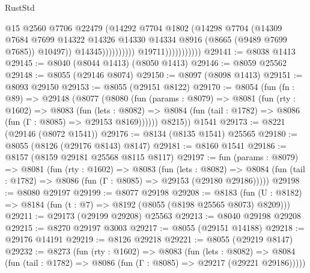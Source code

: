 \begin{lexlean}{RustStd}
\begin{coremodule}
                                            @15
                                            @2560
                                            @7706
                                            @22479
                                            (@14292
                                              @7704
                                              @1802
                                              (@14298
                                                @7704
                                                (@14309
                                                  @7684
                                                  @7699
                                                  @14322
                                                  @14326
                                                  @14330
                                                  @14334
                                                  @8916
                                                  (@8665 (@9489 @7699 @7685))
                                                  @10497))
                                              @14345))))))))))
                          @19711)))))))))))
@29141 := @8038 @1413
@29145 := @8040 (@8044 @1413) (@8050 @1413)
@29146 := @8059 @25562
@29148 := @8055 (@29146 @8074)
@29150 := @8097 (@8098 @1413)
@29151 := @8093 @29150
@29153 := @8055 (@29151 @8122)
@29170 := @8054
    (fun (fn : @89) =>
    @29148
      (@8077
        (@8080
          (fun (params : @8079) =>
          @8081
            (fun (rty : @1602) =>
            @8083
              (fun (lets : @8082) =>
              @8084 (fun (tail : @1782) => @8086 (fun (Γ : @8085) => @29153 @8169))))))
        @8215))
    @1541
@29173 := @8221 (@29146 (@8072 @1541))
@29176 := @8134 (@8135 @1541) @25565
@29180 := @8055 (@8126 (@29176 @8143) @8147)
@29181 := @8160 @1541
@29186 := @8157 (@8159 @29181 @25568 @8115 @8117)
@29197 := fun (params : @8079) =>
  @8081
    (fun (rty : @1602) =>
    @8083
      (fun (lets : @8082) =>
      @8084 (fun (tail : @1782) => @8086 (fun (Γ : @8085) => @29153 (@29180 @29186)))))
@29198 := @8080 @29197
@29199 := @8077 @29198
@29208 := @8183
    (fun (U : @8182) => @8184 (fun (t : @7) => @8192 (@8055 (@8198 @25565 @8073) @8209)))
@29211 := @29173 (@29199 @29208) @25563
@29213 := @8040 @29198 @29208
@29215 := @8270 @29197 @3003
@29217 := @8055 (@29151 @14188)
@29218 := @29176 @14191
@29219 := @8126 @29218
@29221 := @8055 (@29219 @8147)
@29232 := @8273
    (fun (rty : @1602) =>
    @8083
      (fun (lets : @8082) =>
      @8084 (fun (tail : @1782) => @8086 (fun (Γ : @8085) => @29217 (@29221 @29186)))))

\end{coremodule}
\end{lexlean}
